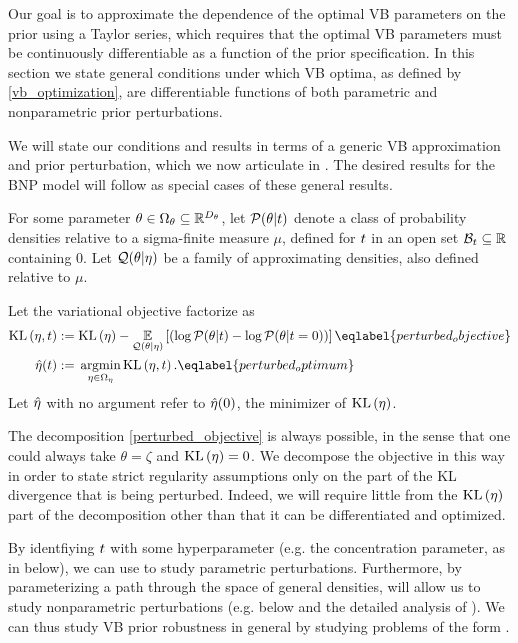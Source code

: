 Our goal is to approximate the dependence of the optimal VB parameters on the
prior using a Taylor series, which requires that the optimal VB parameters must
be continuously differentiable as a function of the prior specification. In this
section we state general conditions under which VB optima, as defined by
\eqref{vb_optimization}, are differentiable functions of both parametric and
nonparametric prior perturbations.

We will state our conditions and results in terms of a generic VB approximation
and prior perturbation, which we now articulate in  . The
desired results for the BNP model will follow as special cases of these general
results.

\begin{defn}
%
For some parameter $\theta \in \Omega_{\theta} \subseteq \mathbb{R}^{{D_{\theta}}}$, let
$\mathcal{P}(\theta \vert t)$ denote a class of probability densities relative to
a sigma-finite measure $\mu$, defined for $t$ in an open set $\mathcal{B}_t
\subseteq \mathbb{R}$ containing $0$.  Let $\mathcal{Q}(\theta \vert \eta)$ be a
family of approximating densities, also defined relative to $\mu$.

Let the variational objective factorize as
%
\begin{align}
%
\KL{\eta, \t} :={}&
    \KL{\eta} -
    \expect{\q(\theta \vert \eta)}
       {\left(\log \p(\theta \vert \t) - \log \p(\theta \vert \t=0)\right)}           \eqlabel{perturbed_objective}\\
\etaopt(\t) :={}& \argmin_{\eta \in \etadom} \KL{\eta, \t}.
    \eqlabel{perturbed_optimum}
%
\end{align}
%
Let $\hat\eta$ with no argument refer to $\hat\eta(0)$, the minimizer
of $\mathrm{KL}\left(\eta\right)$.
%
\end{defn}

The decomposition \eqref{perturbed_objective} is always possible, in the sense
that one could always take $\theta = \zeta$ and $\mathrm{KL}\left(\eta\right) = 0$.  We decompose
the objective in this way in order to state strict regularity assumptions only
on the part of the KL divergence that is being perturbed.  Indeed, we will
require little from the $\mathrm{KL}\left(\eta\right)$ part of the decomposition other than that it
can be differentiated and optimized.

By identfiying $t$ with some hyperparameter (e.g. the concentration parameter,
as in  below), we can use  to study
parametric perturbations.  Furthermore, by parameterizing a path through the
space of general densities,  will allow us to study
nonparametric perturbations (e.g.  below and the
detailed analysis of ).  We
can thus study VB prior robustness in general by studying problems of the
form .

